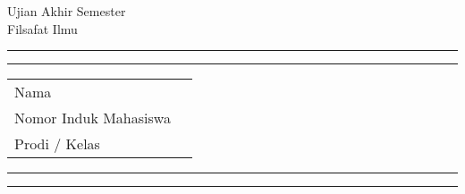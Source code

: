 	\begin{center}
	\huge{Ujian Akhir Semester} \\
	\vspace{2mm}
	\Large{Filsafat Ilmu}
\end{center}

\vspace{5mm}
\hrule
\vspace{1mm}
\hrule

\vspace{3mm}
\begin{tabular}{ll}
	Nama & {\nama} \\
	Nomor Induk Mahasiswa & {\NIM} \\
	Prodi / Kelas & {\prodi} \\
\end{tabular}
\vspace{3mm}

\hrule
\vspace{1mm}
\hrule
\vspace{10mm}